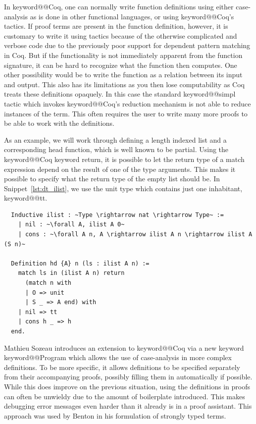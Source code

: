\documentclass[11pt, final]{article}
\makeatletter
\def\<#1>{\csname keyword@@#1\endcsname}
\makeatother
\begin{document}
In \<Coq>, one can normally write function definitions using either case-analysis as is done in other functional languages, or using \<Coq>'s tactics.
If proof terms are present in the function definition, however, it is customary to write it using tactics because of the otherwise complicated and verbose code due to the previously poor support for dependent pattern matching in Coq.
But if the functionality is not immediately apparent from the function signature, it can be hard to recognize what the function then computes.
One other possibility would be to write the function as a relation between its input and output.
This also has its limitations as you then lose computability as Coq treats these definitions opaquely. In this case the standard \<simpl> tactic which invokes \<Coq>'s reduction mechanism is not able to reduce instances of the term.
This often requires the user to write many more proofs to be able to work with the definitions.

As an example, we will work through defining a length indexed list and a corresponding head function, which is well known to be partial.
Using the \<Coq> keyword return, it is possible to let the return type of a match expression depend on the result of one of the type arguments.
This makes it possible to specify what the return type of the empty list should be.
In Snippet~\ref{lst:dt_ilist}, we use the unit type which contains just one inhabitant, \<tt>.

\begin{listing}
  \begin{verbatim}
  Inductive ilist : ~Type \rightarrow nat \rightarrow Type~ :=
    | nil : ~\forall A, ilist A 0~
    | cons : ~\forall A n, A \rightarrow ilist A n \rightarrow ilist A (S n)~

  Definition hd {A} n (ls : ilist A n) :=
    match ls in (ilist A n) return
      (match n with
      | O => unit
      | S _ => A end) with
    | nil => tt
    | cons h _ => h
  end.
  \end{verbatim}
  \caption{Definition of a length indexed list and hd using the return keyword, adapted from Certified Programming with Dependent Types\cite{ChlipalaCPDT}.}
  \label{lst:dt_ilist}
\end{listing}

Mathieu Sozeau introduces an extension to \<Coq> via a new keyword \<Program> which allows the use of case-analysis in more complex definitions\cite{Sozeau2006}\cite{Sozeau2007}.
To be more specific, it allows definitions to be specified separately from their accompanying proofs, possibly filling them in automatically if possible.
While this does improve on the previous situation, using the definitions in proofs can often be unwieldy due to the amount of boilerplate introduced.
This makes debugging error messages even harder than it already is in a proof assistant. This approach was used by Benton in his formulation of strongly typed terms.
\end{document}
